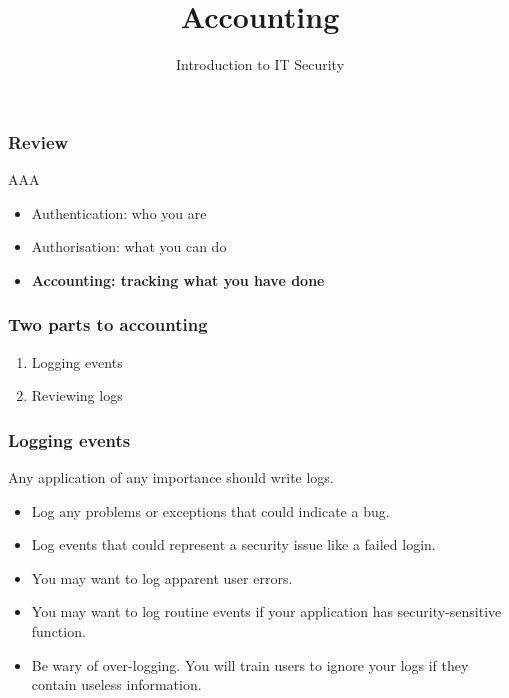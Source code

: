 \documentclass[10pt]{beamer}
\title{Accounting}
\author[IN618]{Introduction to IT Security}
\institute[Otago Polytechnic]{
  Otago Polytechnic \\
  Dunedin, New Zealand \\
}
\date{}
\begin{document}
\begin{frame}[plain]
  \titlepage
\end{frame}


\begin{frame}
  \frametitle{Review}

 AAA

 \begin{itemize}
	 \item Authentication: who you are 
	 \item Authorisation: what you can do
	 \item \textbf{Accounting: tracking what you have done}
 \end{itemize}
\end{frame}

\begin{frame}
  \frametitle{Two parts to accounting}

 \begin{enumerate}
  \item Logging events
  \item Reviewing logs
  \end{enumerate}
\end{frame}

\begin{frame}
  \frametitle{Logging events}

  Any application of any importance should write logs.
 \begin{itemize}
  \item Log any problems or exceptions that could indicate a bug.
  \item Log events that could represent a security issue like a failed login.
  \item You may want to log apparent user errors.
  \item You may want to log routine events if your application has security-sensitive function.
  \item Be wary of over-logging.  You will train users to ignore your logs if they contain useless information.
  \end{itemize}
\end{frame}
\end{document}
